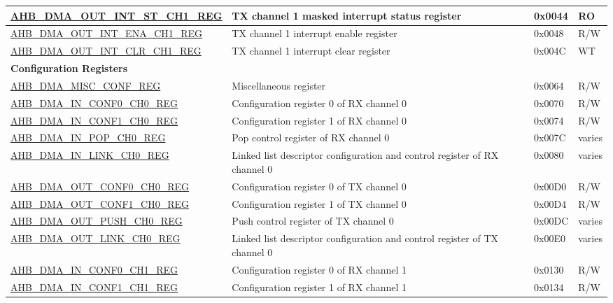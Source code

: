 \begin{longtable}{ | p{8cm} | p{8cm} | p{1.3cm} | p{1.5cm} | }
\hyperref[regdesc:AHBDMAOUTINTSTCHNREG]{AHB\_DMA\_OUT\_INT\_ST\_CH1\_REG} & TX channel 1 masked interrupt status register & 0x0044 & RO \\ \hline
\hyperref[regdesc:AHBDMAOUTINTENACHNREG]{AHB\_DMA\_OUT\_INT\_ENA\_CH1\_REG} & TX channel 1 interrupt enable register & 0x0048 & R/W \\ \hline
\hyperref[regdesc:AHBDMAOUTINTCLRCHNREG]{AHB\_DMA\_OUT\_INT\_CLR\_CH1\_REG} & TX channel 1 interrupt clear register & 0x004C & WT \\ \hline
\multicolumn{4}{|l|}{\textbf{Configuration Registers}} \\ \hline
\hyperref[regdesc:AHBDMAMISCCONFREG]{AHB\_DMA\_MISC\_CONF\_REG} & Miscellaneous register & 0x0064 & R/W \\ \hline
\hyperref[regdesc:AHBDMAINCONF0CHNREG]{AHB\_DMA\_IN\_CONF0\_CH0\_REG} & Configuration register 0 of RX channel 0 & 0x0070 & R/W \\ \hline
\hyperref[regdesc:AHBDMAINCONF1CHNREG]{AHB\_DMA\_IN\_CONF1\_CH0\_REG} & Configuration register 1 of RX channel 0 & 0x0074 & R/W \\ \hline
\hyperref[regdesc:AHBDMAINPOPCHNREG]{AHB\_DMA\_IN\_POP\_CH0\_REG} & Pop control register of RX channel 0 & 0x007C & varies \\ \hline
\hyperref[regdesc:AHBDMAINLINKCHNREG]{AHB\_DMA\_IN\_LINK\_CH0\_REG} & Linked list descriptor configuration and control register of RX channel 0 & 0x0080 & varies \\ \hline
\hyperref[regdesc:AHBDMAOUTCONF0CHNREG]{AHB\_DMA\_OUT\_CONF0\_CH0\_REG} & Configuration register 0 of TX channel 0 & 0x00D0 & R/W \\ \hline
\hyperref[regdesc:AHBDMAOUTCONF1CHNREG]{AHB\_DMA\_OUT\_CONF1\_CH0\_REG} & Configuration register 1 of TX channel 0 & 0x00D4 & R/W \\ \hline
\hyperref[regdesc:AHBDMAOUTPUSHCHNREG]{AHB\_DMA\_OUT\_PUSH\_CH0\_REG} & Push control register of TX channel 0 & 0x00DC & varies \\ \hline
\hyperref[regdesc:AHBDMAOUTLINKCHNREG]{AHB\_DMA\_OUT\_LINK\_CH0\_REG} & Linked list descriptor configuration and control register of TX channel 0 & 0x00E0 & varies \\ \hline
\hyperref[regdesc:AHBDMAINCONF0CHNREG]{AHB\_DMA\_IN\_CONF0\_CH1\_REG} & Configuration register 0 of RX channel 1 & 0x0130 & R/W \\ \hline
\hyperref[regdesc:AHBDMAINCONF1CHNREG]{AHB\_DMA\_IN\_CONF1\_CH1\_REG} & Configuration register 1 of RX channel 1 & 0x0134 & R/W \\ \hline

\end{longtable}
